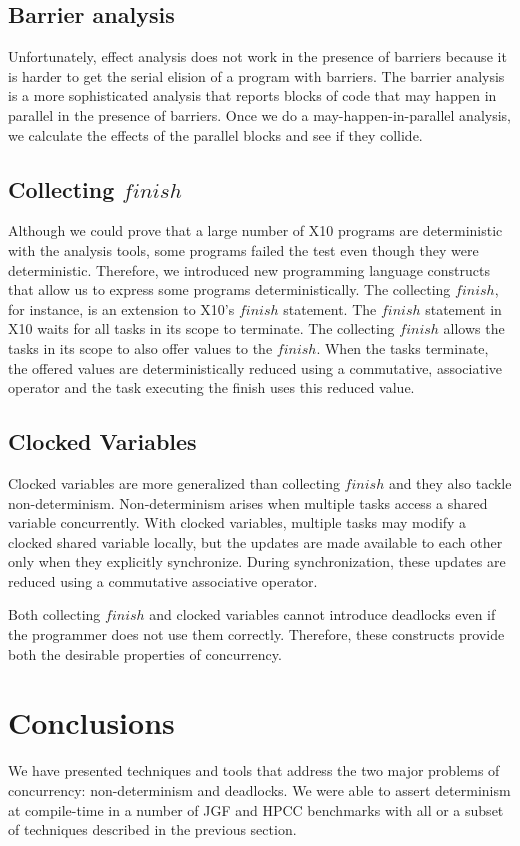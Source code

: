 \documentclass[preprint]{sigplanconf}
\begin{document}
\subsection{Barrier analysis}
Unfortunately, effect analysis does not work in the presence of barriers
because it is harder to get the serial elision of a program with barriers.
The barrier analysis is a more sophisticated analysis that reports blocks of 
code that may happen in parallel in the presence of barriers.
Once we do a may-happen-in-parallel analysis, we calculate the effects of 
the parallel blocks
 and see if they collide.


\subsection{Collecting $finish$}

Although we could prove that a large number of X10 programs are deterministic
with the analysis tools, some programs failed the test even though
they were deterministic. Therefore, we
introduced new programming language constructs that allow us
to express some programs deterministically. The collecting $finish$, for
instance, is an extension to X10's $finish$ statement.
The $finish$ statement in X10 waits for all tasks in its scope to 
terminate. The collecting $finish$ allows the tasks in its scope to
also offer values to the $finish$. When the tasks terminate, the offered values
are deterministically reduced using a commutative, associative operator and the task
executing the finish uses this reduced value.

\subsection{Clocked Variables}
Clocked variables are more generalized than collecting $finish$ and they
also tackle non-determinism.
Non-determinism arises when multiple tasks access a shared variable
concurrently. With clocked variables, multiple tasks may modify a clocked shared
variable locally, but the updates are made available to each other only
when they explicitly synchronize. During synchronization, these updates
are reduced using a commutative associative operator. 

Both collecting $finish$ and clocked variables cannot introduce deadlocks
even if the programmer does not use them correctly. Therefore, these constructs
provide both the desirable properties of concurrency.


\section{Conclusions}
\label{sec:conclusions}
We have presented techniques and tools that address the
two major problems of concurrency: non-determinism and deadlocks.
We were able to assert determinism at compile-time in a number of JGF and 
HPCC benchmarks with all or a subset of techniques described
in the previous section.
\end{document}
